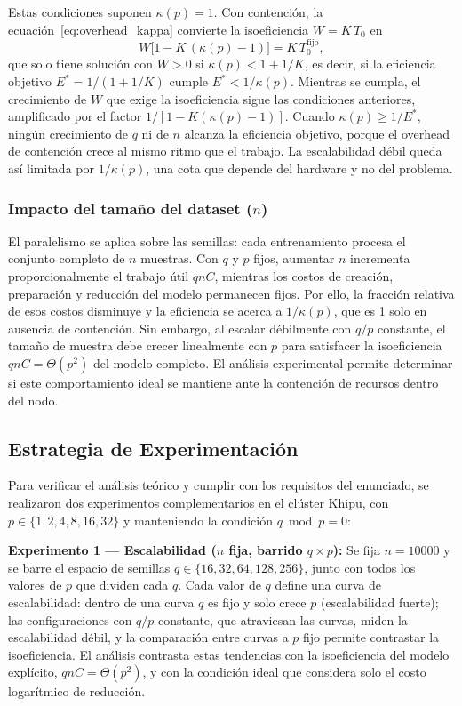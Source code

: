 \documentclass[11pt, a4paper]{article}
\begin{document}
Estas condiciones suponen $\kappa(p)=1$. Con contención, la ecuación~\eqref{eq:overhead_kappa} convierte la isoeficiencia $W=K\,T_0$ en
\[
W\bigl[1-K\,(\kappa(p)-1)\bigr]=K\,T_0^{\mathrm{fijo}},
\]
que solo tiene solución con $W>0$ si $\kappa(p)<1+1/K$, es decir, si la eficiencia objetivo $E^{*}=1/(1+1/K)$ cumple $E^{*}<1/\kappa(p)$. Mientras se cumpla, el crecimiento de $W$ que exige la isoeficiencia sigue las condiciones anteriores, amplificado por el factor $1/[1-K(\kappa(p)-1)]$. Cuando $\kappa(p)\ge 1/E^{*}$, ningún crecimiento de $q$ ni de $n$ alcanza la eficiencia objetivo, porque el overhead de contención crece al mismo ritmo que el trabajo. La escalabilidad débil queda así limitada por $1/\kappa(p)$, una cota que depende del hardware y no del problema.

\subsubsection{Impacto del tamaño del dataset ($n$)}

El paralelismo se aplica sobre las semillas: cada entrenamiento procesa el conjunto completo de $n$ muestras. Con $q$ y $p$ fijos, aumentar $n$ incrementa proporcionalmente el trabajo útil $qnC$, mientras los costos de creación, preparación y reducción del modelo permanecen fijos. Por ello, la fracción relativa de esos costos disminuye y la eficiencia se acerca a $1/\kappa(p)$, que es 1 solo en ausencia de contención. Sin embargo, al escalar débilmente con $q/p$ constante, el tamaño de muestra debe crecer linealmente con $p$ para satisfacer la isoeficiencia $qnC=\Theta(p^2)$ del modelo completo. El análisis experimental permite determinar si este comportamiento ideal se mantiene ante la contención de recursos dentro del nodo.

\subsection{Estrategia de Experimentación}

Para verificar el análisis teórico y cumplir con los requisitos del enunciado, se realizaron dos experimentos complementarios en el clúster Khipu, con $p \in \{1, 2, 4, 8, 16, 32\}$ y manteniendo la condición $q \bmod p = 0$:

\textbf{Experimento 1 --- Escalabilidad ($n$ fija, barrido $q \times p$):} Se fija $n = 10000$ y se barre el espacio de semillas $q \in \{16, 32, 64, 128, 256\}$, junto con todos los valores de $p$ que dividen cada $q$. Cada valor de $q$ define una curva de escalabilidad: dentro de una curva $q$ es fijo y solo crece $p$ (escalabilidad fuerte); las configuraciones con $q/p$ constante, que atraviesan las curvas, miden la escalabilidad débil, y la comparación entre curvas a $p$ fijo permite contrastar la isoeficiencia. El análisis contrasta estas tendencias con la isoeficiencia del modelo explícito, $qnC=\Theta(p^2)$, y con la condición ideal que considera solo el costo logarítmico de reducción.
\end{document}
